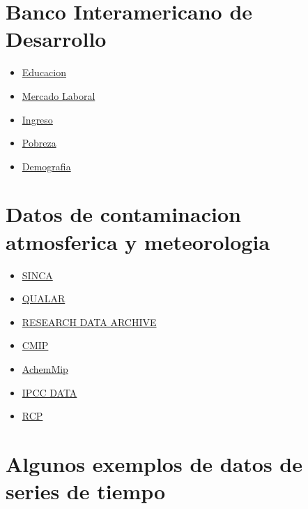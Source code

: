 \documentclass[]{book}
\providecommand{\tightlist}{%
  \setlength{\itemsep}{0pt}\setlength{\parskip}{0pt}}
\begin{document}
\hypertarget{banco-interamericano-de-desarrollo}{%
\section{Banco Interamericano de Desarrollo}\label{banco-interamericano-de-desarrollo}}

\begin{itemize}
\tightlist
\item
  \href{http://www.iadb.org/en/research-and-data//tables,6882.html?indicator=2}{Educacion}
\item
  \href{http://www.iadb.org/en/research-and-data//tables,6882.html?indicator=2}{Mercado Laboral}
\item
  \href{http://www.iadb.org/es/investigacion-y-datos//tablas,6882.html?indicator=4}{Ingreso}
\item
  \href{http://www.iadb.org/es/investigacion-y-datos//pobreza,7526.html}{Pobreza}
\item
  \href{http://www.iadb.org/es/investigacion-y-datos//tablas,6882.html?indicator=1}{Demografia}
\end{itemize}

\hypertarget{datos-de-contaminacion-atmosferica-y-meteorologia}{%
\section{Datos de contaminacion atmosferica y meteorologia}\label{datos-de-contaminacion-atmosferica-y-meteorologia}}

\begin{itemize}
\tightlist
\item
  \href{https://sinca.mma.gob.cl/}{SINCA}
\item
  \href{https://qualar.cetesb.sp.gov.br/qualar/home.do}{QUALAR}
\item
  \href{https://rda.ucar.edu/}{RESEARCH DATA ARCHIVE}
\item
  \href{https://esgf-node.llnl.gov/projects/cmip6/}{CMIP}
\item
  \href{https://wiki.met.no/aerocom/aerchemmip/start}{AchemMip}
\item
  \href{https://www.ipcc.ch/data/}{IPCC DATA}
\item
  \href{http://www.iiasa.ac.at/web-apps/tnt/RcpDb/dsd?Action=htmlpage\&page=welcome}{RCP}
\end{itemize}

\hypertarget{algunos-exemplos-de-datos-de-series-de-tiempo}{%
\section{Algunos exemplos de datos de series de tiempo}\label{algunos-exemplos-de-datos-de-series-de-tiempo}}
\end{document}
